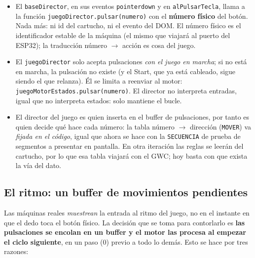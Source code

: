 \begin{itemize}
	\item El \texttt{baseDirector}, en sus eventos \texttt{pointerdown} y en
	\texttt{alPulsarTecla}, llama a la función \texttt{juegoDirector.pulsar(numero)} con el
	\textbf{número físico} del botón. Nada más: ni id del cartucho, ni el evento del DOM.
	El número físico es el identificador estable de la máquina (el mismo que viajará al
	puerto del ESP32); la traducción número $\rightarrow$ acción es cosa del juego.

	\item El \texttt{juegoDirector} solo acepta pulsaciones \emph{con el juego en marcha};
	si no está en marcha, la pulsación no existe (y el Start, que ya está cableado, sigue
	siendo el que relanza). Él se limita a reenviar al motor:
	\texttt{juegoMotorEstados.pulsar(numero)}. El director no interpreta entradas, igual
	que no interpreta estados: solo mantiene el bucle.

	\item El director del juego es quien inserta en el buffer de pulsaciones, por tanto es 
	quien decide qué hace cada número: la tabla número $\rightarrow$ dirección (\texttt{MOVER})
	va \emph{fijada en el código}, igual que ahora se hace con la \texttt{SECUENCIA} de prueba de segmentos a presentar en pantalla. En otra iteración las reglas se leerán del cartucho, por lo que esa tabla viajará con el GWC; hoy basta con que exista la vía del dato.
\end{itemize}

\subsection{El ritmo: un buffer de movimientos pendientes}
\label{subsec:BufferEntrada}

Las máquinas reales \emph{muestrean} la entrada al ritmo del juego, no en el instante en
que el dedo toca el botón físico. La decisión que se toma para contorlarlo es \textbf{las pulsaciones se encolan en un buffer y el motor las procesa al empezar el ciclo siguiente},
en un paso (0) previo a todo lo demás. Esto se hace por tres razones:


